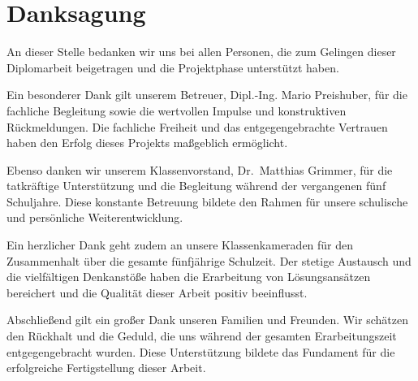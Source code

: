\chapter*{Danksagung}
An dieser Stelle bedanken wir uns bei allen Personen, die zum Gelingen dieser Diplomarbeit beigetragen und die Projektphase unterstützt haben.

Ein besonderer Dank gilt unserem Betreuer, Dipl.-Ing. Mario Preishuber, für die fachliche Begleitung sowie die wertvollen Impulse und konstruktiven Rückmeldungen. Die fachliche Freiheit und das entgegengebrachte Vertrauen haben den Erfolg dieses Projekts maßgeblich ermöglicht.

Ebenso danken wir unserem Klassenvorstand, Dr.\ Matthias Grimmer, für die tatkräftige Unterstützung und die Begleitung während der vergangenen fünf Schuljahre. Diese konstante Betreuung bildete den Rahmen für unsere schulische und persönliche Weiterentwicklung.

Ein herzlicher Dank geht zudem an unsere Klassenkameraden für den Zusammenhalt über die gesamte fünfjährige Schulzeit. Der stetige Austausch und die vielfältigen Denkanstöße haben die Erarbeitung von Lösungsansätzen bereichert und die Qualität dieser Arbeit positiv beeinflusst.

Abschließend gilt ein großer Dank unseren Familien und Freunden. Wir schätzen den Rückhalt und die Geduld, die uns während der gesamten Erarbeitungszeit entgegengebracht wurden. Diese Unterstützung bildete das Fundament für die erfolgreiche Fertigstellung dieser Arbeit.